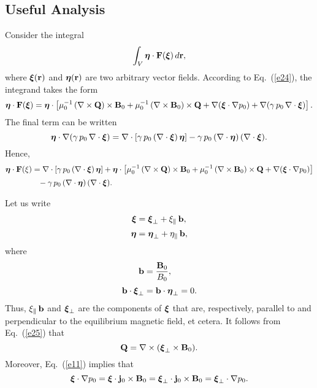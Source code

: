 \documentclass[12pt,prb,aps,notitlepage]{revtex4-1}
\newcommand{\bxi}{\mbox{\boldmath$\xi$}}
\newcommand{\bta}{\mbox{\boldmath$\eta$}}
\begin{document}
\subsection{Useful Analysis}
Consider the integral
 \begin{equation}\label{intg}
\int_V \bta\cdot{\bf F}(\bxi)\,d{\bf r},
\end{equation}
where $\bxi({\bf r})$ and $\bta({\bf r})$ are two arbitrary vector fields. 
According to Eq.~(\ref{e24}), the integrand  takes the form 
\begin{equation}
\bta\cdot {\bf F}(\bxi)= \bta\cdot\left[ \mu_0^{-1}\,(\nabla\times {\bf Q})\times{\bf B}_0+ \mu_0^{-1}\, (\nabla\times {\bf B}_0)\times {\bf Q}
+\nabla(\bxi\cdot\nabla p_0) + \nabla(\gamma\,p_0\,\nabla\cdot\bxi)\right].
\end{equation}
The final term can be written
\begin{equation}
\bta\cdot \nabla(\gamma\,p_0\,\nabla\cdot\bxi)= \nabla\cdot [\gamma\,p_0\,(\nabla\cdot\bxi)\,\bta]-\gamma\,p_0\,(\nabla\cdot\bta)\,(\nabla\cdot\bxi).
\end{equation}
 Hence,
\begin{align}
\bta\cdot {\bf F}(\xi)&= \nabla\cdot [\gamma\,p_0\,(\nabla\cdot\bxi)\,\bta]+\bta\cdot\left[ \mu_0^{-1}\,(\nabla\times {\bf Q})\times{\bf B}_0+ \mu_0^{-1}\, (\nabla\times {\bf B}_0)\times {\bf Q}
+\nabla(\bxi\cdot\nabla p_0)\right]\nonumber\\[0.5ex]
&\phantom{=} -\gamma\,p_0\,(\nabla\cdot\bta)\,(\nabla\cdot\bxi).\label{e31}
\end{align}

Let us write
\begin{align}\label{e32}
\bxi &=\bxi_\perp + \xi_\parallel\,{\bf b},\\[0.5ex]
\bta&=\bta_\perp+\eta_\parallel\,{\bf b},\label{e33x}
\end{align}
where 
\begin{align}
{\bf b} &=\frac{{\bf B}_0}{B_0},\\[0.5ex]
{\bf b} \cdot\bxi_\perp &= {\bf b}\cdot\bta_\perp = 0.
\end{align}
Thus, $\xi_\parallel\,{\bf b}$ and $\bxi_\perp$ are the components of $\bxi$ that are, respectively, parallel to and perpendicular to the equilibrium magnetic field, et cetera.
It follows from Eq.~(\ref{e25}) that
\begin{equation}\label{e36}
{\bf Q} = \nabla\times (\bxi_\perp\times {\bf B}_0).
\end{equation}
Moreover, Eq.~(\ref{e11}) implies that
\begin{equation}\label{e37}
\bxi\cdot\nabla p_0 = \bxi\cdot{\bf j}_0\times {\bf B}_0= \bxi_\perp\cdot{\bf j}_0\times {\bf B}_0= \bxi_\perp\cdot\nabla p_0.
\end{equation}
\end{document}
